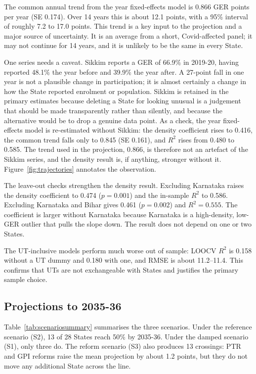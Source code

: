 The common annual trend from the year fixed-effects model is 0.866 GER points per year (SE 0.174). Over 14 years this is about 12.1 points, with a 95\% interval of roughly 7.2 to 17.0 points. This trend is a key input to the projection and a major source of uncertainty. It is an average from a short, Covid-affected panel; it may not continue for 14 years, and it is unlikely to be the same in every State.

One series needs a caveat. Sikkim reports a GER of 66.9\% in 2019-20, having reported 48.1\% the year before and 39.9\% the year after. A 27-point fall in one year is not a plausible change in participation; it is almost certainly a change in how the State reported enrolment or population. Sikkim is retained in the primary estimates because deleting a State for looking unusual is a judgement that should be made transparently rather than silently, and because the alternative would be to drop a genuine data point. As a check, the year fixed-effects model is re-estimated without Sikkim: the density coefficient rises to 0.416, the common trend falls only to 0.845 (SE 0.161), and \(R^2\) rises from 0.480 to 0.585. The trend used in the projection, 0.866, is therefore not an artefact of the Sikkim series, and the density result is, if anything, stronger without it. Figure~\ref{fig:trajectories} annotates the observation.

The leave-out checks strengthen the density result. Excluding Karnataka raises the density coefficient to 0.474 (\(p = 0.001\)) and the in-sample \(R^2\) to 0.586. Excluding Karnataka and Bihar gives 0.461 (\(p = 0.002\)) and \(R^2 = 0.555\). The coefficient is larger without Karnataka because Karnataka is a high-density, low-GER outlier that pulls the slope down. The result does not depend on one or two States.

The UT-inclusive models perform much worse out of sample: LOOCV \(R^2\) is 0.158 without a UT dummy and 0.180 with one, and RMSE is about 11.2--11.4. This confirms that UTs are not exchangeable with States and justifies the primary sample choice.

\subsection{Projections to 2035-36}

Table~\ref{tab:scenariosummary} summarises the three scenarios. Under the reference scenario (S2), 13 of 28 States reach 50\% by 2035-36. Under the damped scenario (S1), only three do. The reform scenario (S3) also produces 13 crossings: PTR and GPI reforms raise the mean projection by about 1.2 points, but they do not move any additional State across the line.

